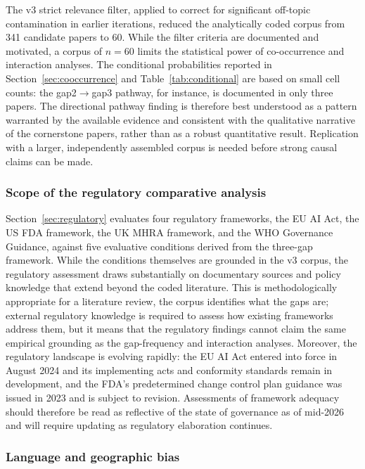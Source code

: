 The v3 strict relevance filter, applied to correct for significant off-topic contamination in earlier iterations, reduced the analytically coded corpus from 341 candidate papers to 60. While the filter criteria are documented and motivated, a corpus of $n=60$ limits the statistical power of co-occurrence and interaction analyses. The conditional probabilities reported in Section~\ref{sec:cooccurrence} and Table~\ref{tab:conditional} are based on small cell counts: the gap2$\rightarrow$gap3 pathway, for instance, is documented in only three papers. The directional pathway finding is therefore best understood as a pattern warranted by the available evidence and consistent with the qualitative narrative of the cornerstone papers, rather than as a robust quantitative result. Replication with a larger, independently assembled corpus is needed before strong causal claims can be made.

\subsubsection{Scope of the regulatory comparative analysis}
\label{sec:limitation_regulatory}

Section~\ref{sec:regulatory} evaluates four regulatory frameworks, the EU AI Act, the US FDA framework, the UK MHRA framework, and the WHO Governance Guidance, against five evaluative conditions derived from the three-gap framework. While the conditions themselves are grounded in the v3 corpus, the regulatory assessment draws substantially on documentary sources and policy knowledge that extend beyond the coded literature. This is methodologically appropriate for a literature review, the corpus identifies what the gaps are; external regulatory knowledge is required to assess how existing frameworks address them, but it means that the regulatory findings cannot claim the same empirical grounding as the gap-frequency and interaction analyses. Moreover, the regulatory landscape is evolving rapidly: the EU AI Act entered into force in August 2024 and its implementing acts and conformity standards remain in development, and the FDA's predetermined change control plan guidance was issued in 2023 and is subject to revision. Assessments of framework adequacy should therefore be read as reflective of the state of governance as of mid-2026 and will require updating as regulatory elaboration continues.

\subsubsection{Language and geographic bias}
\label{sec:limitation_bias}


